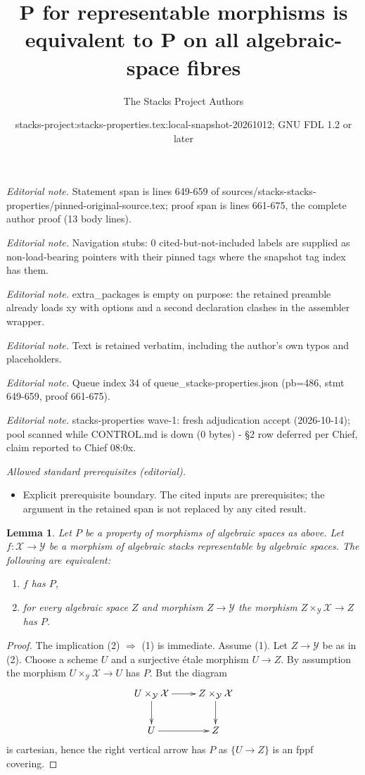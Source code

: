 \documentclass[10pt,a4paper]{amsart}
\title{P for representable morphisms is equivalent to P on all algebraic-space fibres}
\author{The Stacks Project Authors}
\date{stacks-project:stacks-properties.tex:local-snapshot-20261012; GNU FDL 1.2 or later}
\theoremstyle{plain}
\newtheorem{lemma}[subsection]{Lemma}
\theoremstyle{definition}
\theoremstyle{remark}
\numberwithin{equation}{subsection}
\begin{document}
\maketitle
\noindent\textit{Editorial note.} Statement span is lines 649-659 of sources/stacks-stacks-properties/pinned-original-source.tex; proof span is lines 661-675, the complete author proof (13 body lines).\par\medskip
\noindent\textit{Editorial note.} Navigation stubs: 0 cited-but-not-included labels are supplied as non-load-bearing pointers with their pinned tags where the snapshot tag index has them.\par\medskip
\noindent\textit{Editorial note.} extra\_packages is empty on purpose: the retained preamble already loads xy with options and a second declaration clashes in the assembler wrapper.\par\medskip
\noindent\textit{Editorial note.} Text is retained verbatim, including the author's own typos and placeholders.\par\medskip
\noindent\textit{Editorial note.} Queue index 34 of queue\_stacks-properties.json (pb=486, stmt 649-659, proof 661-675).\par\medskip
\noindent\textit{Editorial note.} stacks-properties wave-1: fresh adjudication accept (2026-10-14); pool scanned while CONTROL.md is down (0 bytes) - §2 row deferred per Chief, claim reported to Chief 08:0x.\par\medskip
\noindent\textit{Allowed standard prerequisites (editorial).}\begin{itemize}
\item Explicit prerequisite boundary. The cited inputs are prerequisites; the argument in the retained span is not replaced by any cited result.
\end{itemize}\medskip
\begin{lemma}
\label{lemma-property-spaces-too}
Let $P$ be a property of morphisms of algebraic spaces as above.
Let $f : \mathcal{X} \to \mathcal{Y}$ be a morphism of algebraic stacks
representable by algebraic spaces. The following are equivalent:
\begin{enumerate}
\item $f$ has $P$,
\item for every algebraic space $Z$ and morphism $Z \to \mathcal{Y}$
the morphism $Z \times_\mathcal{Y} \mathcal{X} \to Z$ has $P$.
\end{enumerate}
\end{lemma}

\begin{proof}
The implication (2) $\Rightarrow$ (1) is immediate. Assume (1).
Let $Z \to \mathcal{Y}$ be as in (2). Choose a scheme $U$ and a
surjective \'etale morphism $U \to Z$. By assumption the morphism
$U \times_\mathcal{Y} \mathcal{X} \to U$ has $P$. But the diagram
$$
\xymatrix{
U \times_\mathcal{Y} \mathcal{X} \ar[d] \ar[r] &
Z \times_\mathcal{Y} \mathcal{X} \ar[d] \\
U \ar[r] & Z
}
$$
is cartesian, hence the right vertical arrow has $P$ as
$\{U \to Z\}$ is an fppf covering.
\end{proof}
\end{document}
